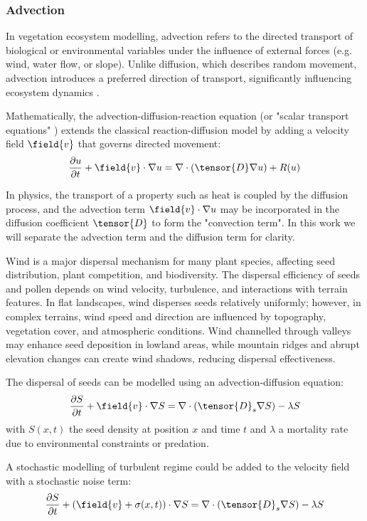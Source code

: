 \subsubsection{Advection}
In vegetation ecosystem modelling, advection refers to the directed transport of biological or environmental variables under the influence of external forces (e.g. wind, water flow, or slope). Unlike diffusion, which describes random movement, advection introduces a preferred direction of transport, significantly influencing ecosystem dynamics \cite{Burger2020}.

Mathematically, the advection-diffusion-reaction equation (or "scalar transport equations" \cite{Baukal2000}) extends the classical reaction-diffusion model by adding a velocity field $\field{v}$ that governs directed movement:
\begin{align}
    \frac{\partial u}{\partial t} + \field{v} \cdot \nabla u = \nabla \cdot \left( \tensor{D} \nabla u \right) + R(u)
\end{align}

In physics, the transport of a property such as heat is coupled by the diffusion process, and the advection term $\field{v} \cdot \nabla u$ may be incorporated in the diffusion coefficient $\tensor{D}$ to form the "convection term". In this work we will separate the advection term and the diffusion term for clarity.

Wind is a major dispersal mechanism for many plant species, affecting seed distribution, plant competition, and biodiversity. The dispersal efficiency of seeds and pollen depends on wind velocity, turbulence, and interactions with terrain features. In flat landscapes, wind disperses seeds relatively uniformly; however, in complex terrains, wind speed and direction are influenced by topography, vegetation cover, and atmospheric conditions. Wind channelled through valleys may enhance seed deposition in lowland areas, while mountain ridges and abrupt elevation changes can create wind shadows, reducing dispersal effectiveness.

The dispersal of seeds can be modelled using an advection-diffusion equation:
\begin{align}
    \frac{\partial S}{\partial t} + \field{v} \cdot \nabla S = \nabla \cdot (\tensor{D}_s \nabla S) - \lambda S
\end{align}
with $S(x, t)$ the seed density at position $x$ and time $t$ and $\lambda$ a mortality rate due to environmental constraints or predation.

A stochastic modelling of turbulent regime could be added to the velocity field with a stochastic noise term:
\begin{align}
    \frac{\partial S}{\partial t} + (\field{v} + \sigma(x, t)) \cdot \nabla S = \nabla \cdot (\tensor{D}_s \nabla S) - \lambda S
\end{align}

